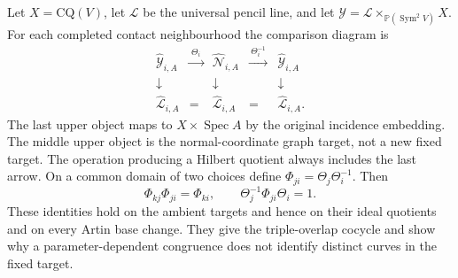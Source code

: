 \documentclass[11pt,reqno]{amsart}
\numberwithin{equation}{section}
\theoremstyle{definition}\newtheorem{definition}[theorem]{Definition}
\theoremstyle{remark}\newtheorem{remark}[theorem]{Remark}
\newcommand{\Pj}{\mathbb P}\newcommand{\A}{\mathbb A}
\DeclareMathOperator{\Sym}{Sym}\DeclareMathOperator{\Gr}{Gr}
\begin{document}
Let $X=\mathrm{CQ}(V)$, let $\mathcal L$ be the universal pencil
line, and let $\mathcal Y=\mathcal L\times_{\Pj(\Sym^2V)}X$.
For each completed contact neighbourhood the comparison diagram is
\begin{equation}\label{eq:target-undo-v166}
\begin{array}{ccccc}
 \widehat{\mathcal Y}_{i,A}&\xrightarrow{\ \Theta_i\ }&
       \widehat{\mathcal N}_{i,A}
       &\xrightarrow{\ \Theta_i^{-1}\ }&\widehat{\mathcal Y}_{i,A}\\
 \downarrow&&\downarrow&&\downarrow\\
 \widehat{\mathcal L}_{i,A}&=&\widehat{\mathcal L}_{i,A}
       &=&\widehat{\mathcal L}_{i,A}.
\end{array}
\end{equation}
The last upper object maps to $X\times\operatorname{Spec}A$ by
the original incidence embedding. The middle upper object is the
normal-coordinate graph target, not a new fixed target. The
operation producing a Hilbert quotient always includes the last
arrow. On a common domain of two choices define
$\Phi_{ji}=\Theta_j\Theta_i^{-1}$. Then
\begin{equation}\label{eq:frame-cocycle-v166}
 \Phi_{kj}\Phi_{ji}=\Phi_{ki},\qquad
 \Theta_j^{-1}\Phi_{ji}\Theta_i=1.
\end{equation}
These identities hold on the ambient targets and hence on their
ideal quotients and on every Artin base change. They give the
triple-overlap cocycle and show why a parameter-dependent congruence
does not identify distinct curves in the fixed target.
\end{document}
